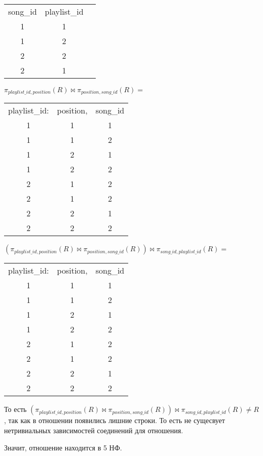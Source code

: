 \documentclass{article}
\begin{document}
	\begin{center}
		\begin{tabular}{ccc}
			song\_id & playlist\_id \\
			1 & 1\\
			1 & 2 \\
			2 & 2\\
			2 & 1\\
		\end{tabular}
	\end{center}


		$\pi_{playlist\_id, position}(R) \bowtie \pi_{position, song\_id}(R) =$
		
		\begin{center}
			\begin{tabular}{ccc}
				playlist\_id: & position,& song\_id \\
				1 & 1 & 1\\
				1 & 1 & 2 \\
				1 & 2 & 1\\
				1 & 2 & 2\\
				2 & 1 & 2\\
				2 & 1 & 2\\
				2 & 2 & 1\\
				2 & 2 & 2\\
			\end{tabular}
		\end{center}
	
	$(\pi_{playlist\_id, position}(R) \bowtie \pi_{position, song\_id}(R)) \bowtie  \pi_{song\_id, playlist\_id}(R) = $
	
		\begin{center}
				\begin{tabular}{ccc}
					playlist\_id: & position,& song\_id \\
					1 & 1 & 1\\
					1 & 1 & 2 \\
					1 & 2 & 1\\
					1 & 2 & 2\\
					2 & 1 & 2\\
					2 & 1 & 2\\
					2 & 2 & 1\\
					2 & 2 & 2\\
				\end{tabular}
			\end{center}
	
	
	То есть $(\pi_{playlist\_id, position}(R) \bowtie \pi_{position, song\_id}(R)) \bowtie  \pi_{song\_id, playlist\_id}(R) \neq R$, так как в отношении появились лишние строки. То есть не сущесвует нетривиальных зависимостей соединений для отношения.
	
	Значит, отношение находится в 5 НФ.
\end{document}
